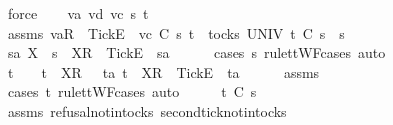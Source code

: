 \ force\isanewline
{}\isamarkupfalse%
\isanewline
\ \ \isamarkupfalse%
\ va\ vd\ vc\ s{}{\isacharprime}\ t\isanewline
\ \ \isamarkupfalse%
\ assms{\isacharcolon}\ {\isachardoublequoteopen}{\isacharbrackleft}va{\isacharbrackright}\isactrlsub R\ {\isacharhash}\ {\isacharbrackleft}Tick{\isacharbrackright}\isactrlsub E\ {\isacharhash}\ vc\ {\isasymsubseteq}\isactrlsub C\ s{}{\isacharprime}{\isachardoublequoteclose}\ {\isachardoublequoteopen}t\ {\isasymin}\ tocks\ UNIV{\isachardoublequoteclose}\ {\isachardoublequoteopen}t\ {\isasymle}\isactrlsub C\ s{}{\isacharprime}\ {\isacharat}\ s{}{\isachardoublequoteclose}\isanewline
\ \ \isamarkupfalse%
\ \isamarkupfalse%
\ s{}{\isacharprime}a\ X\ \ {\isachardoublequoteopen}s{}{\isacharprime}\ {\isacharequal}\ {\isacharbrackleft}X{\isacharbrackright}\isactrlsub R\ {\isacharhash}\ {\isacharbrackleft}Tick{\isacharbrackright}\isactrlsub E\ {\isacharhash}\ s{}{\isacharprime}a{\isachardoublequoteclose}\isanewline
\ \ \ \ \isamarkupfalse%
\ {\isacharparenleft}cases\ s{}{\isacharprime}\ rule{\isacharcolon}ttWF{\isachardot}cases{\isacharcomma}\ auto{\isacharparenright}\isanewline
\ \ \isamarkupfalse%
\ \isamarkupfalse%
\ {\isachardoublequoteopen}t\ {\isacharequal}\ {\isacharbrackleft}{\isacharbrackright}\ {\isasymor}\ t\ {\isacharequal}\ {\isacharbrackleft}{\isacharbrackleft}X{\isacharbrackright}\isactrlsub R{\isacharbrackright}\ {\isasymor}\ {\isacharparenleft}{\isasymexists}\ ta{\isachardot}\ t\ {\isacharequal}\ {\isacharbrackleft}X{\isacharbrackright}\isactrlsub R\ {\isacharhash}\ {\isacharbrackleft}Tick{\isacharbrackright}\isactrlsub E\ {\isacharhash}\ ta{\isacharparenright}{\isachardoublequoteclose}\isanewline
\ \ \ \ \isamarkupfalse%
\ assms{\isacharparenleft}{}{\isacharparenright}\ \isamarkupfalse%
\ {\isacharparenleft}cases\ t\ rule{\isacharcolon}ttWF{\isachardot}cases{\isacharcomma}\ auto{\isacharparenright}\isanewline
\ \ \isamarkupfalse%
\ \isamarkupfalse%
\ {\isachardoublequoteopen}t\ {\isasymle}\isactrlsub C\ s{}{\isacharprime}{\isachardoublequoteclose}\isanewline
\ \ \ \ \isamarkupfalse%
\ assms{\isacharparenleft}{}{\isacharparenright}\ refusal{\isacharunderscore}notin{\isacharunderscore}tocks\ second{\isacharunderscore}tick{\isacharunderscore}notin{\isacharunderscore}tocks\ \isamarkupfalse%

